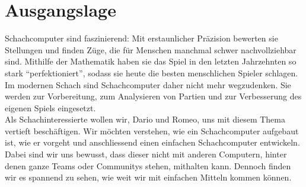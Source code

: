 \chapter{Ausgangslage}
Schachcomputer sind faszinierend: Mit erstaunlicher Präzision bewerten sie Stellungen und finden Züge, die für Menschen
manchmal schwer nachvollziehbar sind. Mithilfe der Mathematik haben sie das Spiel in den letzten Jahrzehnten
so stark \enquote{perfektioniert}, sodass sie heute die besten menschlichen Spieler schlagen. \\

Im modernen Schach sind Schachcomputer daher nicht mehr wegzudenken. Sie werden zur Vorbereitung, zum Analysieren von
Partien und zur Verbesserung des eigenen Spiels eingesetzt. \\

Als Schachinteressierte wollen wir, Dario und Romeo, uns mit diesem Thema vertieft beschäftigen. Wir möchten verstehen,
wie ein Schachcomputer aufgebaut ist, wie er vorgeht und anschliessend einen einfachen Schachcomputer entwickeln. \\

Dabei sind wir uns bewusst, dass dieser nicht mit anderen Computern, hinter denen ganze Teams oder Communitys stehen,
mithalten kann. Dennoch finden wir es spannend zu sehen, wie weit wir mit einfachen Mitteln kommen können.
